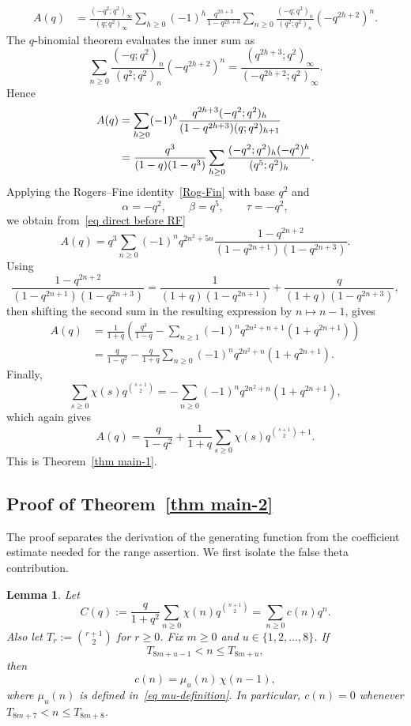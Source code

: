 \documentclass[10pt,a4paper]{amsart}
\newtheorem{lemma}      {Lemma}
\numberwithin{equation}{section}
\begin{document}
\begin{align}
A(q)
&=\frac{(-q^2;q^2)_\infty}{(q;q^2)_\infty}
\sum_{h\ge0}(-1)^h\frac{q^{2h+3}}{1-q^{2h+3}}
\sum_{n\ge0}\frac{(-q;q^2)_n}{(q^2;q^2)_n}(-q^{2h+2})^n. \label{eq direct geom}
\end{align}
The $q$-binomial theorem evaluates the inner sum as
\[
\sum_{n\ge0}\frac{(-q;q^2)_n}{(q^2;q^2)_n}(-q^{2h+2})^n
=\frac{(q^{2h+3};q^2)_\infty}{(-q^{2h+2};q^2)_\infty}.
\]
Hence
\begin{align}
A(q)
&=\sum_{h\ge0}(-1)^h
\frac{q^{2h+3}(-q^2;q^2)_h}{(1-q^{2h+3})(q;q^2)_{h+1}} \notag\\
&=\frac{q^3}{(1-q)(1-q^3)}
\sum_{h\ge0}\frac{(-q^2;q^2)_h(-q^2)^h}{(q^5;q^2)_h}. \label{eq direct before RF}
\end{align}
Applying the Rogers--Fine identity~\eqref{Rog-Fin} with base $q^2$ and
\[
\alpha=-q^2,\qquad \beta=q^5,\qquad \tau=-q^2,
\]
we obtain from~\eqref{eq direct before RF}
\begin{equation}\label{eq direct after RF}
A(q)=q^3\sum_{n\ge0}(-1)^n q^{2n^2+5n}
\frac{1-q^{2n+2}}{(1-q^{2n+1})(1-q^{2n+3})}.
\end{equation}
Using
\[
\frac{1-q^{2n+2}}{(1-q^{2n+1})(1-q^{2n+3})}
=\frac{1}{(1+q)(1-q^{2n+1})}+\frac{q}{(1+q)(1-q^{2n+3})},
\]
then shifting the second sum in the resulting expression by $n\mapsto n-1$, gives
\begin{align*}
A(q)
&=\frac{1}{1+q}\left(\frac{q^3}{1-q}
-\sum_{n\ge1}(-1)^nq^{2n^2+n+1}(1+q^{2n+1})\right)\\
&=\frac{q}{1-q^2}-\frac{q}{1+q}
\sum_{n\ge0}(-1)^nq^{2n^2+n}(1+q^{2n+1}).
\end{align*}
Finally,
\[
\sum_{s\ge0}\chi(s)q^{\binom{s+1}{2}}
=-\sum_{n\ge0}(-1)^nq^{2n^2+n}(1+q^{2n+1}),
\]
which again gives
\[
A(q)=\frac{q}{1-q^2}+\frac{1}{1+q}\sum_{s\ge0}\chi(s)q^{\binom{s+1}{2}+1}.
\]
This is Theorem~\ref{thm main-1}.

%

\subsection{Proof of Theorem~\ref{thm main-2}}\label{sec proof main-2}
%
The proof separates the derivation of the generating function from the coefficient estimate needed for the range assertion.  We first isolate the false theta contribution.

\begin{lemma}\label{lem false theta block}
Let
\[
C(q):=\frac{q}{1+q^2}\sum_{n\ge 0}\chi(n)q^{\binom{n+1}{2}}=\sum_{n\ge 0} c(n)q^n.
\]
Also let $T_r:=\binom{r+1}{2}$ for $r\ge 0$.  Fix $m\ge 0$ and $u\in\{1,2,\dots,8\}$.  If
\[
T_{8m+u-1}<n\le T_{8m+u},
\]
then
\begin{equation}\label{eq exact c(n)}
c(n)=\mu_u(n)\,\chi(n-1),
\end{equation}
where $\mu_u(n)$ is defined in~\eqref{eq mu-definition}. In particular, $c(n)=0$ whenever $T_{8m+7}<n\le T_{8m+8}$.
\end{lemma}
\end{document}
